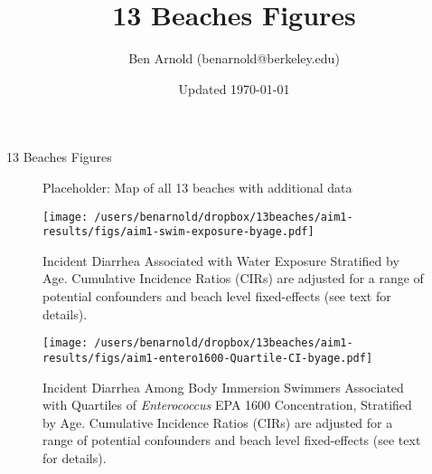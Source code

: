\documentclass[11pt]{article}
\title{13 Beaches Figures}
\author{Ben Arnold (benarnold@berkeley.edu)}
\date{Updated \today}
\begin{document}
{\centerline {\LARGE 13 Beaches Figures} }



\vspace{100pt}
\begin{figure}[htbp]
\begin{center}
\begin{minipage}{1.2\textwidth}
\caption{Placeholder: Map of all 13 beaches with additional data}
\label{fig:map}
\end{minipage}
\end{center}
\end{figure}

\begin{landscape}
\begin{figure}[htbp]
\begin{center}
\texttt{[image: /users/benarnold/dropbox/13beaches/aim1-results/figs/aim1-swim-exposure-byage.pdf]}
\begin{minipage}{1.2\textwidth}
\caption{Incident Diarrhea Associated with Water Exposure Stratified by Age. Cumulative Incidence Ratios (CIRs) are adjusted for a range of potential confounders and beach level fixed-effects (see text for details).}
\label{fig:swimex}
\end{minipage}
\end{center}
\end{figure}
\end{landscape}

\begin{landscape}
\begin{figure}[htbp]
\begin{center}
\texttt{[image: /users/benarnold/dropbox/13beaches/aim1-results/figs/aim1-entero1600-Quartile-CI-byage.pdf]} 
\begin{minipage}{1.2\textwidth}
\caption{Incident Diarrhea Among Body Immersion Swimmers Associated with Quartiles of \textit{Enterococcus} EPA 1600 Concentration, Stratified by Age. Cumulative Incidence Ratios (CIRs) are adjusted for a range of potential confounders and beach level fixed-effects (see text for details).}
\label{fig:enteroquartile}
\end{minipage}
\end{center}
\end{figure}
\end{landscape}
\end{document}
